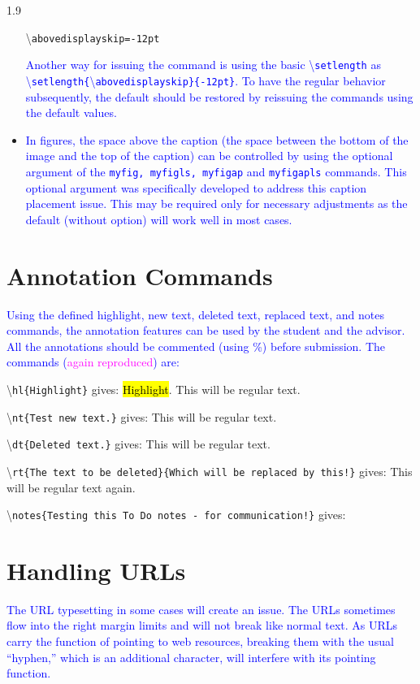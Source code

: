 \documentclass[phd]{ndsu-thesis-2022}
\newcommand\myspacing{1.9}      %
\newcommand\italk[1]{\textcolor{blue}{#1}}  %
\newcommand\cmd[1]{\textbackslash\texttt{#1}}  %
\begin{document}
\begin{spacing}{\myspacing}
\begin{itemize}
\cmd{abovedisplayskip=-12pt}

\italk{Another way for issuing the command is using the basic \cmd{setlength} as \\ \cmd{setlength\{}\cmd{abovedisplayskip\}\{-12pt\}}. To have the regular behavior subsequently, the default should be restored by reissuing the commands using the default values.}
\item
\italk{In figures, the space above the caption (the space between the bottom of the image and the top of the caption) can be controlled by using the optional argument of the \texttt{myfig, myfigls, myfigap} and \texttt{myfigapls} commands. This optional argument was specifically developed to address this caption placement issue. This may be required only for necessary adjustments as the default (without option) will work well in most cases.}
\end{itemize}

\section{Annotation Commands}
\italk{Using the defined highlight, new text, deleted text, replaced text, and notes commands, the annotation features can be used by the student and the advisor. All the annotations should be commented (using \%) before submission. The commands (\textcolor{magenta}{again reproduced}) are:} 

\textbackslash\texttt{hl\{Highlight\}} gives: \hl{Highlight}. This will be regular text. 

\textbackslash\texttt{nt\{Test new text.\}} gives:  This will be regular text. 

\textbackslash\texttt{dt\{Deleted text.\}} gives:  This will be regular text. 

\textbackslash\texttt{rt\{The text to be deleted\}\{Which will be replaced by this!\}} gives:  This will be regular text again. 

\textbackslash\texttt{notes\{Testing this To Do notes - for communication!\}} gives: 

\section{Handling URLs}
\italk{The URL typesetting in some cases will create an issue. The URLs sometimes flow into the right margin limits and will not break like normal text. As URLs carry the function of pointing to web resources, breaking them with the usual ``hyphen,'' which is an additional character, will interfere with its pointing function.} 


\end{spacing}
\end{document}
